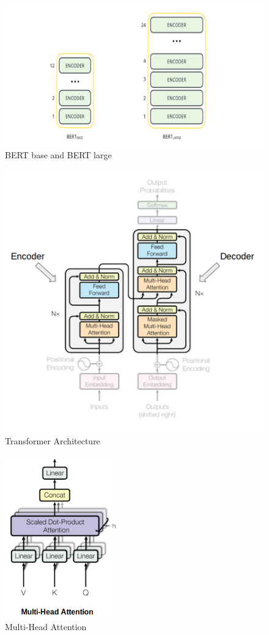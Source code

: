 \documentclass[11pt,a4paper]{article}
\begin{document}
\begin{figure}[!htbp]
	\centering
	\includegraphics{figures/figure1.png}
	\caption{\label{fig:my-label} BERT base and BERT large \cite{BERT}}
\end{figure}

\begin{figure}[!htbp]
	\centering
	\includegraphics{figures/figure2.png}
	\caption{\label{fig:my-label} Transformer Architecture \cite{attention}}
\end{figure}

\begin{figure}[!htbp]
	\centering
	\includegraphics{figures/figure3.png}
	\caption{\label{fig:my-label} Multi-Head Attention \cite{attention}}
\end{figure}
\end{document}
